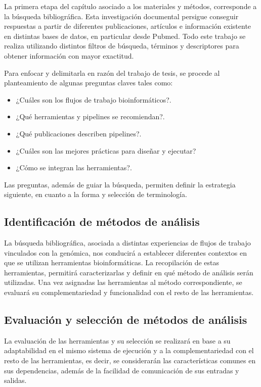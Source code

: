 \documentclass[12pt]{article}
\begin{document}
La primera etapa del capítulo asociado a los materiales 
y métodos, corresponde a la búsqueda bibliográfica. Esta  
investigación documental persigue conseguir respuestas a 
partir de diferentes publicaciones, artículos  e información 
existente en distintas  bases de datos, en particular  
desde Pubmed. Todo este trabajo se realiza utilizando distintos
filtros de búsqueda,  términos y descriptores para obtener 
información con mayor exactitud.

Para enfocar y delimitarla en razón del trabajo de tesis, se 
procede al planteamiento  de algunas preguntas claves tales como:

\begin{itemize}
    \item ¿Cuáles son los flujos de trabajo bioinformáticos?.
    \item ¿Qué herramientas y pipelines se recomiendan?.
    \item ¿Qué publicaciones describen pipelines?.
    \item ¿Cuáles son las mejores prácticas para diseñar y ejecutar?
    \item ¿Cómo se integran las herramientas?.
\end{itemize}

Las preguntas, además de guiar la búsqueda, permiten definir 
la estrategia siguiente, en cuanto a la forma y  selección de 
terminología.

\subsection*{Identificación de métodos de análisis}

La búsqueda bibliográfica, asociada a distintas experiencias 
de flujos de trabajo vinculados con la genómica, nos conducirá 
a establecer diferentes contextos en que se utilizan herramientas 
bioinformáticas. La recopilación de estas herramientas, permitirá  
caracterizarlas y definir en qué método de análisis serán utilizadas.
Una vez asignadas las herramientas al método correspondiente, 
se evaluará su complementariedad y funcionalidad con el resto 
de las herramientas.

\subsection*{Evaluación y selección de métodos de análisis}

La evaluación de las herramientas y su selección se realizará 
en base a su adaptabilidad en el mismo sistema de ejecución y 
a la complementariedad con el resto de las herramientas, es 
decir, se considerarán las características comunes en sus 
dependencias, además de  la facilidad de comunicación de sus 
entradas y salidas.
\end{document}
